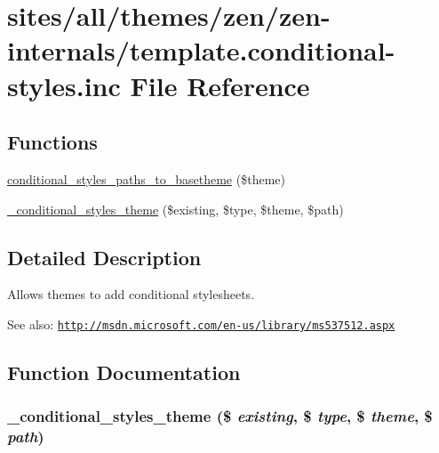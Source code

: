 \hypertarget{template_8conditional-styles_8inc}{
\section{sites/all/themes/zen/zen-internals/template.conditional-styles.inc File Reference}
\label{template_8conditional-styles_8inc}
}
\subsection*{Functions}
\begin{CompactItemize}
\item 
\hyperlink{template_8conditional-styles_8inc_6acb74cfb52f6e1a84f2083239c7fcde}{conditional\_\-styles\_\-paths\_\-to\_\-basetheme} (\$theme)
\item 
\hyperlink{template_8conditional-styles_8inc_c75e817fce5c82c6b852222f736945ae}{\_\-conditional\_\-styles\_\-theme} (\$existing, \$type, \$theme, \$path)
\end{CompactItemize}


\subsection{Detailed Description}
Allows themes to add conditional stylesheets.

\begin{Desc}
\item[See also:]\href{http://msdn.microsoft.com/en-us/library/ms537512.aspx}{\tt http://msdn.microsoft.com/en-us/library/ms537512.aspx} \end{Desc}


\subsection{Function Documentation}
\hypertarget{template_8conditional-styles_8inc_c75e817fce5c82c6b852222f736945ae}{
\subsubsection[{\_\-conditional\_\-styles\_\-theme}]{\setlength{\rightskip}{0pt plus 5cm}\_\-conditional\_\-styles\_\-theme (\$ {\em existing}, \/  \$ {\em type}, \/  \$ {\em theme}, \/  \$ {\em path})}}
\label{template_8conditional-styles_8inc_c75e817fce5c82c6b852222f736945ae}


